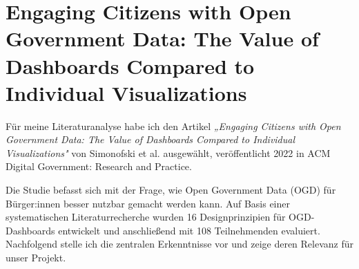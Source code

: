\section[Engaging Citizens with Open Government Data]{Engaging Citizens with Open Government Data: The Value of Dashboards Compared to Individual Visualizations}
Für meine Literaturanalyse habe ich den Artikel \textit{„Engaging Citizens with Open Government Data: The Value of Dashboards Compared to Individual Visualizations"} \cite{simonofski2022} von Simonofski et al. ausgewählt, veröffentlicht 2022 in ACM Digital Government: Research and Practice.

\smallskip
\noindent
Die Studie befasst sich mit der Frage, wie Open Government Data (OGD) für Bürger:innen besser nutzbar gemacht werden kann. Auf Basis einer systematischen Literaturrecherche wurden 16 Designprinzipien für OGD-Dashboards entwickelt und anschließend mit 108 Teilnehmenden evaluiert. Nachfolgend stelle ich die zentralen Erkenntnisse vor und zeige deren Relevanz für unser Projekt.

